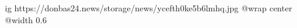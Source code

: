 
 
 
 
 

\ifcmt
  ig https://donbas24.news/storage/news/ycefth0ke5b6lmhq.jpg
  @wrap center
  @width 0.6
\fi
